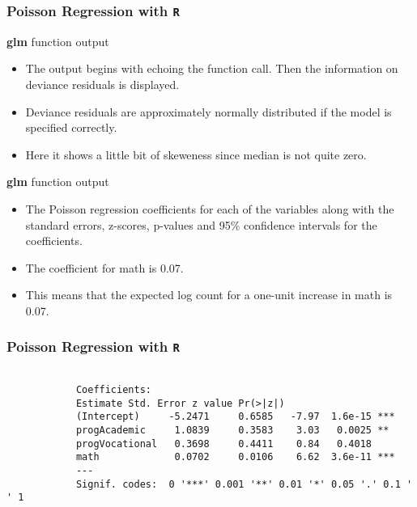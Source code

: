 \documentclass[00-GLMregslides.tex]{subfiles}
\begin{document}
\begin{frame}[fragile]

\frametitle{Poisson Regression with \texttt{R}}
\Large 
\textbf{glm} function output
\begin{itemize}
 \item The output begins with echoing the function call. Then the information on deviance residuals is displayed. 
 \item Deviance residuals are approximately normally distributed if the model is specified correctly.
 \item Here it shows a little bit of skeweness since median is not quite zero. 
\end{itemize}
\end{frame}
%		
%			
%			
\begin{frame}
\Large 
\textbf{glm} function output
\begin{itemize}
\item The Poisson regression coefficients for each of the variables along with the standard errors, z-scores, p-values 
and 95\% confidence intervals for the coefficients. 
\item The coefficient for math is 0.07.
\item This means that the expected log count for a one-unit increase in math is 0.07. 
\end{itemize}
\end{frame}
		\begin{frame}[fragile]
			
			\frametitle{Poisson Regression with \texttt{R}}
			
			\begin{verbatim}
			
			Coefficients:
			Estimate Std. Error z value Pr(>|z|)    
			(Intercept)     -5.2471     0.6585   -7.97  1.6e-15 ***
			progAcademic     1.0839     0.3583    3.03   0.0025 ** 
			progVocational   0.3698     0.4411    0.84   0.4018    
			math             0.0702     0.0106    6.62  3.6e-11 ***
			---
			Signif. codes:  0 '***' 0.001 '**' 0.01 '*' 0.05 '.' 0.1 ' ' 1
			
			\end{verbatim}
			
		\end{frame}
\end{document}
